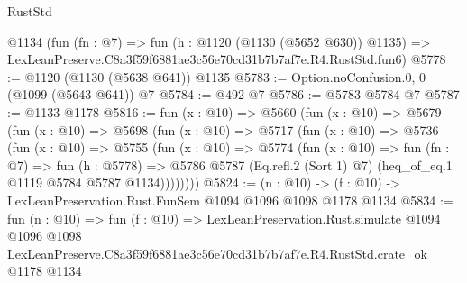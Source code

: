 \begin{lexlean}{RustStd}
\begin{coremodule}
    @1134
    (fun (fn : @7) =>
    fun (h : @1120 (@1130 (@5652 @630)) @1135) =>
    LexLeanPreserve.C8a3f59f6881ae3c56e70cd31b7b7af7e.R4.RustStd.fun6)
@5778 := @1120 (@1130 (@5638 @641)) @1135
@5783 := Option.noConfusion.{0, 0} (@1099 (@5643 @641)) @7
@5784 := @492 @7
@5786 := @5783 @5784 @7
@5787 := @1133 @1178
@5816 := fun (x : @10) =>
  @5660
    (fun (x : @10) =>
    @5679
      (fun (x : @10) =>
      @5698
        (fun (x : @10) =>
        @5717
          (fun (x : @10) =>
          @5736
            (fun (x : @10) =>
            @5755
              (fun (x : @10) =>
              @5774
                (fun (x : @10) =>
                fun (fn : @7) =>
                fun (h : @5778) =>
                @5786 @5787 (Eq.refl.{2} (Sort 1) @7) (heq_of_eq.{1} @1119 @5784 @5787 @1134))))))))
@5824 := (n : @10) -> (f : @10) -> LexLeanPreservation.Rust.FunSem @1094 @1096 @1098 @1178 @1134
@5834 := fun (n : @10) =>
  fun (f : @10) =>
  LexLeanPreservation.Rust.simulate
    @1094
    @1096
    @1098
    LexLeanPreserve.C8a3f59f6881ae3c56e70cd31b7b7af7e.R4.RustStd.crate_ok
    @1178
    @1134
\end{coremodule}
\end{lexlean}
